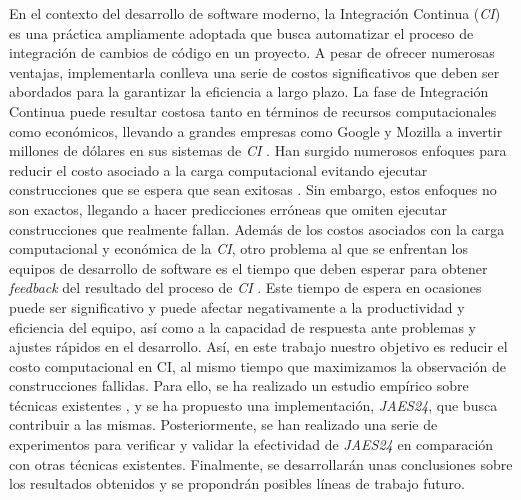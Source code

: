 En el contexto del desarrollo de software moderno, la Integración Continua (\textit{CI}) es una 
práctica ampliamente adoptada que busca automatizar el proceso de integración de cambios de código
en un proyecto. A pesar de ofrecer numerosas ventajas, implementarla conlleva una serie de costos
significativos que deben ser abordados para la garantizar la eficiencia a largo plazo. La fase de
Integración Continua puede resultar costosa tanto en términos de recursos computacionales como
económicos, llevando a grandes empresas como Google y Mozilla a invertir millones de dólares en
sus sistemas de \textit{CI} \cite{1}. Han surgido numerosos enfoques para reducir el costo asociado
a la carga computacional evitando ejecutar construcciones que se espera que sean exitosas
\cite{2}. Sin embargo, estos enfoques no son exactos, llegando a  hacer predicciones erróneas que
omiten ejecutar construcciones que realmente fallan. Además de los costos asociados con la carga
computacional y económica de la \textit{CI}, otro problema al que se enfrentan los equipos de
desarrollo de software es el tiempo que deben esperar para obtener \textit{feedback} del
resultado del proceso de \textit{CI} \cite{3}. Este tiempo de espera en ocasiones puede ser
significativo y puede afectar negativamente a la productividad y eficiencia del equipo, así como
a la capacidad de respuesta ante problemas y ajustes rápidos en el desarrollo. Así, en este
trabajo nuestro objetivo es reducir el costo computacional en CI, al mismo tiempo que maximizamos
la observación de construcciones fallidas. Para ello, se ha realizado un estudio empírico sobre
técnicas existentes \cite{2,4,5,6,7,8}, y se ha propuesto una implementación, \textit{JAES24}, que
busca contribuir a las mismas. Posteriormente, se han realizado una serie de experimentos para
verificar y validar la efectividad de \textit{JAES24} en comparación con otras técnicas existentes.
Finalmente, se desarrollarán unas conclusiones sobre los resultados obtenidos y se propondrán
posibles líneas de trabajo futuro.

\vspace{0.5cm}

